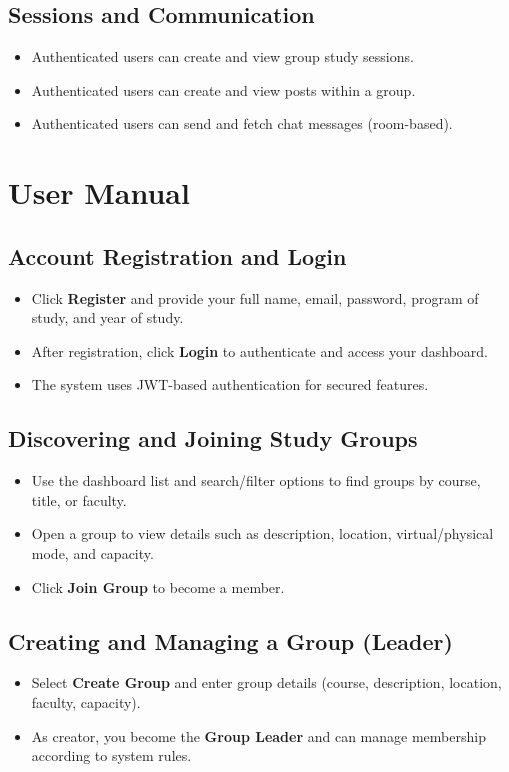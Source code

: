 \documentclass[12pt]{article}
\begin{document}
\subsection{Sessions and Communication}
\begin{itemize}
  \item Authenticated users can create and view group study sessions.
  \item Authenticated users can create and view posts within a group.
  \item Authenticated users can send and fetch chat messages (room-based).
\end{itemize}

\section{User Manual}
\subsection{Account Registration and Login}
\begin{itemize}
  \item Click \textbf{Register} and provide your full name, email, password, program of study, and year of study.
  \item After registration, click \textbf{Login} to authenticate and access your dashboard.
  \item The system uses JWT-based authentication for secured features.
\end{itemize}

\subsection{Discovering and Joining Study Groups}
\begin{itemize}
  \item Use the dashboard list and search/filter options to find groups by course, title, or faculty.
  \item Open a group to view details such as description, location, virtual/physical mode, and capacity.
  \item Click \textbf{Join Group} to become a member.
\end{itemize}

\subsection{Creating and Managing a Group (Leader)}
\begin{itemize}
  \item Select \textbf{Create Group} and enter group details (course, description, location, faculty, capacity).
  \item As creator, you become the \textbf{Group Leader} and can manage membership according to system rules.
\end{itemize}
\end{document}

